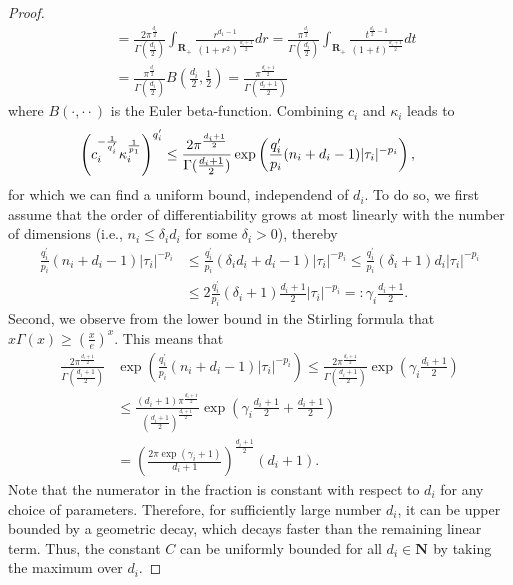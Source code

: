 \documentclass[a4paper]{article}
\newcommand{\nn}[1]{\mathbf{N}^{#1}}
\newcommand{\rr}[1]{\mathbf{R}^{#1}}
\newcommand{\abs}[1]{| #1|}     %
\numberwithin{equation}{section}
\theoremstyle{remark}
\begin{document}
\begin{proof}
\begin{align*}
    &=\frac{2\pi^\frac{d_i}{2}}{\Gamma(\frac{d_i}{2})}
        \int_{\rr{}_+}\frac{r^{d_1-1}}{(1+r^2)^{\frac{d_i+1}{2}}}dr
    =\frac{\pi^\frac{d_i}{2}}{\Gamma(\frac{d_i}{2})}
        \int_{\rr{}_+}\frac{t^{\frac{d_1}{2}-1}}{(1+t)^{\frac{d_i+1}{2}}}dt
    \\
    &=\frac{\pi^\frac{d_i}{2}}{\Gamma(\frac{d_i}{2})}B\left(\frac{d_i}{2},\frac{1}{2}\right)
    =\frac{\pi^\frac{d_i+1}{2}}{\Gamma(\frac{d_i+1}{2})}
\end{align*}
where $B(\cdot,\cdot\cdot)$ is the Euler beta-function.
Combining $c_i$ and $\kappa_i$ leads to
\begin{align*}
    &\kern-1em\left(c_i^{-\frac{1}{q_i^\prime}}\kappa_i^{\frac{1}{p_1}}\right)^{q_i^\prime}
    \leq
    \frac{2\pi^\frac{d_i+1}{2}}{\Gamma(\frac{d_i+1}{2})}
    \exp\left({\frac{q_i^\prime}{p_i}(n_i+d_i-1)\abs{\tau_i}^{-p_i}}\right)
    ,
\end{align*}
for which we can find a uniform bound, independend of $d_i$.
To do so, we first assume that 
the order of differentiability
grows at most linearly with the number of dimensions
(i.e., $n_i\leq\delta_i d_i$ for some $\delta_i>0$), thereby
\begin{align}
    \frac{q_i^\prime}{p_i}(n_i+d_i-1)\abs{\tau_i}^{-p_i}
    &\leq \frac{q_i^\prime}{p_i}(\delta_id_i+d_i-1)\abs{\tau_i}^{-p_i}
    \leq \frac{q_i^\prime}{p_i}(\delta_i+1)d_i\abs{\tau_i}^{-p_i}\\
    &\leq 2\frac{q_i^\prime}{p_i}(\delta_i+1)\frac{d_i+1}{2}\abs{\tau_i}^{-p_i}
    =:\gamma_i\frac{d_i+1}{2}.
\end{align}
Second, we observe from
the lower bound in the Stirling formula
that $x\Gamma(x)\geq \left(\frac{x}{e}\right)^{x}$.
This means that
\begin{align*}
    \frac{2\pi^\frac{d_i+1}{2}}{\Gamma(\frac{d_i+1}{2})}
    &\exp\left({\frac{q_i^\prime}{p_i}(n_i+d_i-1)\abs{\tau_i}^{-p_i}}\right)
    \leq
    \frac{2\pi^\frac{d_i+1}{2}}
         {\Gamma(\frac{d_i+1}{2})}
         \exp\left(\gamma_i\frac{d_i+1}{2}\right)
    \\
    &\leq
    \frac{(d_i+1)\pi^\frac{d_i+1}{2}}
         {\left(\frac{d_i+1}{2}\right)^{\frac{d_i+1}{2}}}
        \exp\left(\gamma_i\frac{d_i+1}{2}+\frac{d_i+1}{2}\right)
    \\
    &=
    \left(\frac{2\pi
          \exp\left(\gamma_i+1\right)}{d_i+1}\right)^{\frac{d_i+1}{2}}(d_i+1).
\end{align*}
Note that the numerator in the fraction is constant with respect to $d_i$ for any choice of parameters.
Therefore, for sufficiently large number $d_i$,
it can be upper bounded by a geometric decay,
which decays faster than the remaining linear term.
Thus, the constant $C$ can be uniformly bounded
for all $d_i\in\nn{}$ by taking the maximum over $d_i$.
\end{proof}
\end{document}

